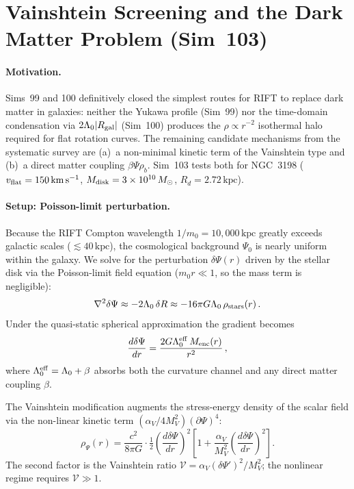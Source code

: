 \documentclass[12pt,a4paper]{article}
\begin{document}
\section{Vainshtein Screening and the Dark Matter Problem (Sim~103)}
\label{sec:sim103}

\paragraph{Motivation.}
Sims~99 and 100 definitively closed the simplest routes for RIFT to replace dark
matter in galaxies: neither the Yukawa profile (Sim~99) nor the time-domain
condensation via $2\Lambda_0|R_{\rm gal}|$ (Sim~100) produces the $\rho\propto r^{-2}$
isothermal halo required for flat rotation curves.  The remaining candidate
mechanisms from the systematic survey are (a)~a non-minimal kinetic term of the
Vainshtein type and (b)~a direct matter coupling $\beta\Psi\rho_b$.
Sim~103 tests both for NGC~3198 ($v_{\rm flat} = 150\,\mathrm{km\,s^{-1}}$,
$M_{\rm disk} = 3\times 10^{10}\,M_\odot$, $R_d = 2.72\,\mathrm{kpc}$).

\paragraph{Setup: Poisson-limit perturbation.}
Because the RIFT Compton wavelength $1/m_0 = 10{,}000\,\mathrm{kpc}$ greatly exceeds
galactic scales ($\lesssim 40\,\mathrm{kpc}$), the cosmological background
$\Psi_0$ is nearly uniform within the galaxy.  We solve for the perturbation
$\delta\Psi(r)$ driven by the stellar disk via the Poisson-limit field equation
($m_0 r \ll 1$, so the mass term is negligible):
\begin{equation}
\nabla^2\delta\Psi \approx -2\Lambda_0\,\delta R \approx
  -16\pi G\Lambda_0\,\rho_{\rm stars}(r)\,.
\end{equation}
Under the quasi-static spherical approximation the gradient becomes
\begin{equation}
\frac{d\delta\Psi}{dr} = \frac{2G\Lambda_0^{\rm eff}\,M_{\rm enc}(r)}{r^2}\,,
\label{eq:dPsi_poisson}
\end{equation}
where $\Lambda_0^{\rm eff} = \Lambda_0 + \beta$ absorbs both the curvature channel
and any direct matter coupling $\beta$.

The Vainshtein modification augments the stress-energy density of the scalar field via
the non-linear kinetic term $(\alpha_V/4M_V^2)(\partial\Psi)^4$:
\begin{equation}
\rho_\Psi(r) = \frac{c^2}{8\pi G}
  \cdot\tfrac{1}{2}\!\left(\frac{d\delta\Psi}{dr}\right)^{\!2}
  \left[1 + \frac{\alpha_V}{M_V^2}\!\left(\frac{d\delta\Psi}{dr}\right)^{\!2}\right].
\label{eq:rho_Vainshtein}
\end{equation}
The second factor is the Vainshtein ratio $\mathcal{V} = \alpha_V(\delta\Psi')^2/M_V^2$;
the nonlinear regime requires $\mathcal{V} \gg 1$.
\end{document}
